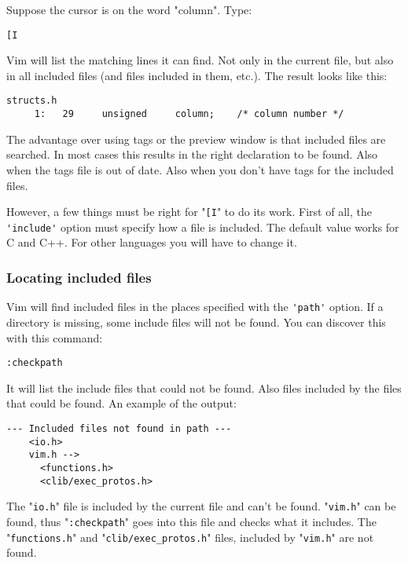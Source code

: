 Suppose the cursor is on the word "column".
Type:

\begin{Verbatim}[samepage=true]
 [I
\end{Verbatim}

Vim will list the matching lines it can find.
Not only in the current file, but also in all included files (and files included in them, etc.).
The result looks like this:

\begin{Verbatim}[samepage=true]
    structs.h 
     1:   29     unsigned     column;    /* column number */ 
\end{Verbatim}

The advantage over using tags or the preview window is that included files are searched.
In most cases this results in the right declaration to be found.
Also when the tags file is out of date.
Also when you don't have tags for the included files.

However, a few things must be right for "\verb![I!" to do its work.
First of all, the \verb!'include'! option must specify how a file is included.
The default value works for C and C++.
For other languages you will have to change it.
\subsubsection{Locating included files}
Vim will find included files in the places specified with the \verb!'path'! option.
If a directory is missing, some include files will not be found.
You can discover this with this command:

\begin{Verbatim}[samepage=true]
 :checkpath
\end{Verbatim}

It will list the include files that could not be found.
Also files included by the files that could be found.
An example of the output:

\begin{Verbatim}[samepage=true]
    --- Included files not found in path --- 
    <io.h> 
    vim.h --> 
      <functions.h> 
      <clib/exec_protos.h> 
\end{Verbatim}

The "\verb!io.h!" file is included by the current file and can't be found.
"\verb!vim.h!" can be found, thus "\verb!:checkpath!" goes into this file and checks what it includes.
The "\verb!functions.h!" and "\verb!clib/exec_protos.h!" files, included by "\verb!vim.h!" are not found.

